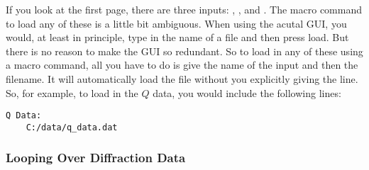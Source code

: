 If you look at the first page, there are three inputs:
, , and 
. The macro command to load any of these
is a little bit ambiguous. When using the acutal GUI, 
you would, at least in principle, type in the name of
a file and then press load. But there is no reason to
make the GUI so redundant. So to load in any of these
using a macro command, all you have to do is give the 
name of the input and then the filename. It will 
automatically load the file without you explicitly
giving the  line. So, for example,
to load in the $Q$ data, you would include the 
following lines:
\begin{lstlisting}[caption={'Load the $Q$ Data'}]
Q Data:
    C:/data/q_data.dat
\end{lstlisting}

\subsubsection{Looping Over Diffraction Data}
\label{LoopOverDiffractionData}

